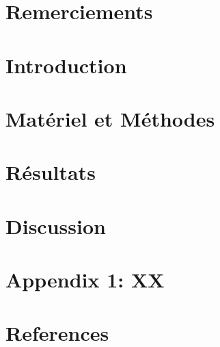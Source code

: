 \documentclass[12pt,]{article}
\let\oldsection\section
\renewcommand\section{\clearpage\oldsection}
\begin{document}
\hypertarget{remerciements}{%
\section{Remerciements}\label{remerciements}}

\hypertarget{introduction}{%
\section{Introduction}\label{introduction}}

\hypertarget{materiel-et-methodes}{%
\section{Matériel et Méthodes}\label{materiel-et-methodes}}

\hypertarget{resultats}{%
\section{Résultats}\label{resultats}}

\hypertarget{discussion}{%
\section{Discussion}\label{discussion}}

\hypertarget{appendix-appendix}{%
\appendix}


\hypertarget{appendix-1-xx}{%
\section{Appendix 1: XX}\label{appendix-1-xx}}

\hypertarget{references}{%
\section{References}\label{references}}



\end{document}
